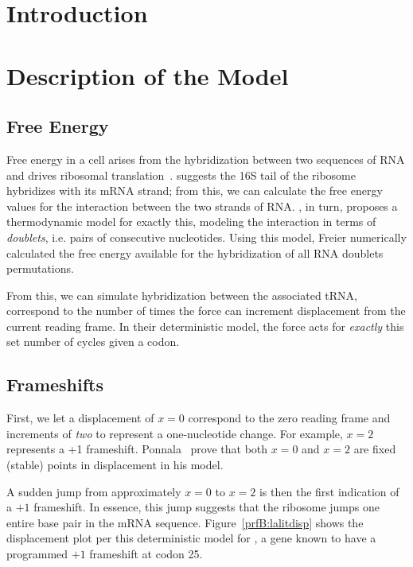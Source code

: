 \documentclass[12pt, draft]{article}
\numberwithin{equation}{section}
\begin{document}
\section{Introduction}

\section{Description of the Model}
\subsection{Free Energy}
\label{freeenergy}

Free energy in a cell arises from the hybridization between two
sequences of RNA and drives ribosomal translation~\cite{starmer}.
\citet{weiss88} suggests the 16S tail of the ribosome hybridizes with its mRNA strand;
from this, we can calculate the free energy values for the interaction between the two strands of RNA.
\citet{freier}, in turn, proposes a thermodynamic model for exactly this,
modeling the interaction in terms of \emph{doublets}, i.e. pairs of consecutive nucleotides.
Using this model, Freier numerically calculated the free energy available
for the hybridization of all RNA doublets permutations.

From this, we can simulate hybridization between the associated tRNA, correspond to the number
of times the force can increment displacement from the current reading frame.
In their deterministic model, the force acts for \emph{exactly} this set number of cycles given a codon.

\subsection{Frameshifts}


First, we let a displacement of $x = 0$ correspond to the zero reading frame and increments of
\emph{two} to represent a one-nucleotide change. For example, $x =2$ represents a +1 frameshift.
Ponnala~\cite{lalit:embs} prove that both $x = 0$ and $x = 2$ are fixed (stable) points in displacement in his model.

A sudden jump from approximately $x = 0$ to $x = 2$ is then the first indication of a $+1$ frameshift.
In essence, this jump suggests that the ribosome jumps one entire base pair in the mRNA sequence.
Figure~\ref{prfB:lalitdisp} shows the displacement plot per this deterministic model for \prfB, 
a gene known to have a programmed $+1$ frameshift at codon 25.
\end{document}

